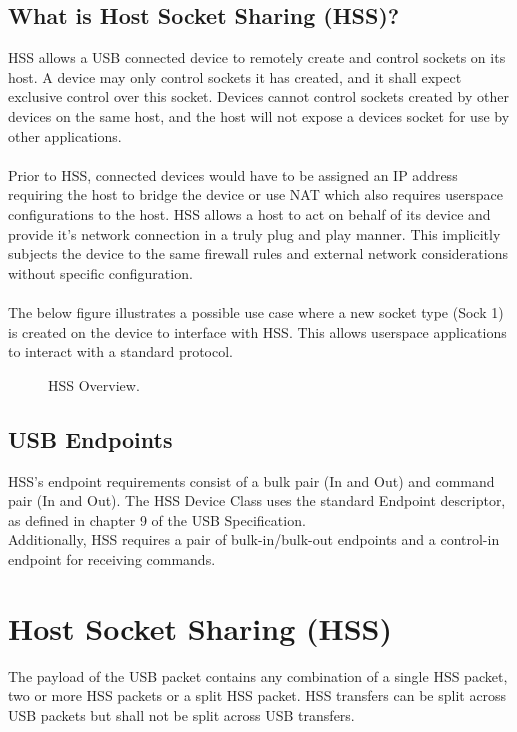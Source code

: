 \documentclass[10pt]{article}
\begin{document}
	\subsection{What is Host Socket Sharing (HSS)?}
	HSS allows a USB connected device to remotely create and control sockets on its host. A device may only control sockets it has created, and it shall expect exclusive control over this socket. Devices cannot control sockets created by other devices on the same host, and the host will not expose a devices socket for use by other applications.\\
	\\
	Prior to HSS, connected devices would have to be assigned an IP address requiring the host to bridge the device or use NAT which also requires userspace configurations to the host. HSS allows a host to act on behalf of its device and provide it's network connection in a truly plug and play manner. This implicitly subjects the device to the same firewall rules and external network considerations without specific configuration.\\
	\\
	The below figure illustrates a possible use case where a new socket type (Sock 1) is created on the device to interface with HSS. This allows userspace applications to interact with a standard protocol. 
	\begin{figure}[H]
		\begin{center}
			\caption[HSS Overview]{HSS Overview.}
			\scalebox{0.9}{}
		\end{center}
	\end{figure}

	\subsection{USB Endpoints}
	HSS's endpoint requirements consist of a bulk pair (In and Out) and command pair (In and Out). 
	The HSS Device Class uses the standard Endpoint descriptor, as defined in chapter 9 of the USB
	Specification. \\
	Additionally, HSS requires a pair of bulk-in/bulk-out endpoints and a control-in endpoint for receiving commands.
	\section{Host Socket Sharing (HSS)}
	The payload of the USB packet contains any combination of a single HSS packet, 
	two or more HSS packets or a split HSS packet. HSS transfers can be split across USB packets but shall not be split across USB transfers. 
\end{document}
